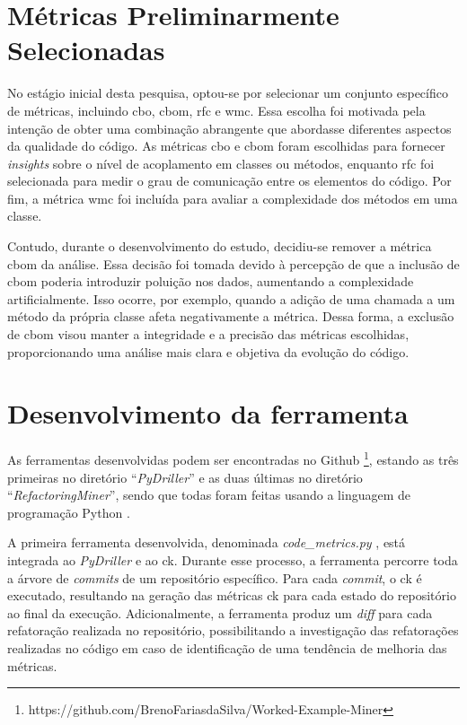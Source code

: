\section{Métricas Preliminarmente Selecionadas}

No estágio inicial desta pesquisa, optou-se por selecionar um conjunto específico de métricas, incluindo \gls{cbo}, \gls{cbom}, \gls{rfc} e \gls{wmc}. Essa escolha foi motivada pela intenção de obter uma combinação abrangente que abordasse diferentes aspectos da qualidade do código. As métricas \gls{cbo} e \gls{cbom} foram escolhidas para fornecer \textit{insights} sobre o nível de acoplamento em classes ou métodos, enquanto \gls{rfc} foi selecionada para medir o grau de comunicação entre os elementos do código. Por fim, a métrica \gls{wmc} foi incluída para avaliar a complexidade dos métodos em uma classe.

Contudo, durante o desenvolvimento do estudo, decidiu-se remover a métrica \gls{cbom} da análise. Essa decisão foi tomada devido à percepção de que a inclusão de \gls{cbom} poderia introduzir poluição nos dados, aumentando a complexidade artificialmente. Isso ocorre, por exemplo, quando a adição de uma chamada a um método da própria classe afeta negativamente a métrica. Dessa forma, a exclusão de \gls{cbom} visou manter a integridade e a precisão das métricas escolhidas, proporcionando uma análise mais clara e objetiva da evolução do código.

\section{Desenvolvimento da ferramenta}

As ferramentas desenvolvidas podem ser encontradas no Github \footnote{https://github.com/BrenoFariasdaSilva/Worked-Example-Miner}, estando as três primeiras no diretório ``\textit{PyDriller}'' e as duas últimas no diretório ``\textit{RefactoringMiner}'', sendo que todas foram feitas usando a linguagem de programação Python \cite{PythonProgrammingLanguage}.

A primeira ferramenta desenvolvida, denominada \textit{code\_metrics.py} \cite{PyDriller:CodeMetrics:2023}, está integrada ao \textit{PyDriller} e ao \gls{ck}. Durante esse processo, a ferramenta percorre toda a árvore de \textit{commits} de um repositório específico. Para cada \textit{commit}, o \gls{ck} é executado, resultando na geração das métricas \gls{ck} para cada estado do repositório ao final da execução. Adicionalmente, a ferramenta produz um \textit{diff} para cada refatoração realizada no repositório, possibilitando a investigação das refatorações realizadas no código em caso de identificação de uma tendência de melhoria das métricas.


